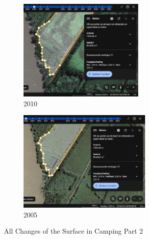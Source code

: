 \begin{figure}[H]
    \begin{subfigure}[b]{0.48\textwidth}
        \includegraphics[width=\linewidth, height =5cm]{figures/appendix-g/opp2010.png}
        \caption{2010}
        \label{fig:second}
    \end{subfigure}
    \hfill
    \begin{subfigure}[b]{0.48\textwidth}
        \includegraphics[width=\linewidth, height =5cm]{figures/appendix-g/opp2005.png}
        \caption{2005}
        \label{fig:second}
    \end{subfigure}

    \caption{All Changes of the Surface in Camping Part 2}
    \label{fig:All Changes of the Surface in Camping Part 2}
\end{figure}

